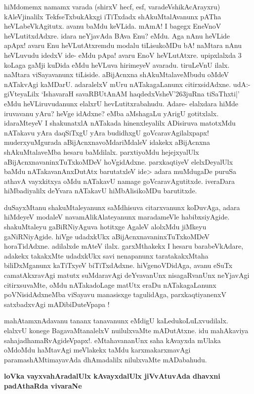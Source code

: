 hiMdomemx namamx varada (shirxV hecf, esf, varadeVshikAcArayxru) kAleVjinalilx TekfseTxbukAkxgi iTiTxdadx shAkuMtalAvanunx pATha heVLabeVkAgitutx. avanu baMdu keVLida. mAmA! I bagegx EneVnoV heVLutitxdAdxre. idara neYjavAda BAva Enu? eMdu. Aga nAnu heVLide apApx! avaru Enu heVLutAtxremdu modalu tiLisukoMDu bA! naMtara nAnu heVLuvudu idedxV ide- eMdu pApa! avaru EnoV heVLutAtxre. upipxlalxda 3 koLaga gaMji kuDida eMdu heVLuva hirimeyeV avaradu. tiruLeVnU ilalx. naMtara viSayavanunx tiLiside. aBijAcnxna shAkuMtalaveMbudu oMdeV nATakvAgi kaMDarU. adaralelxV mUru nATakagaLanunx citirxsidAdxne. udA:- giVteyaLilx `IshavaraH savaRBUtAnAM haqdedxVsheV\char'263juRna tiSaThxti|' eMdu heVLiruvudanunx elalxrU hevLutitxrabahudu. Adare- elalxdara hiMde iruvavanu yAru? heVge idAdxne? eMba aMshagaLu yArigU gotitxlalx. idaraMteyeV I shakunatxlA nATakada hinenxleyalilx ADisiruva matotxMdu nATakavu yAra daqSiTxgU yAra budidhxgU goVcaravAgilalxpapx! muderxyuMgurada aBijAcnxnavoMdariMdaleV idakekx aBijAcnxna shAkuMtalaveMba hesaru baMdilalx. parxtiyoMdu hejejxyalUlx aBijAcnxnavaninxTuTxkoMDeV hoVgidAdxne. parxkaqtiyeV elelxDeyalUlx baMdu nATakavanAnxDutAtx barutatxleV ide> adara muMdugaDe puruSa athavA vayxkitxya oMdu nATakavU namage goVcaravAgutitxde. iveraDara hiMbadiyalilx deYvara nATakavU hiMbAlisikoMDu barutitxde.

duSayxMtanu shakuMtaleyanunx saMdhisuva citarxvanunx koDuvAga, adara hiMdeyeV modaleV navamAlikAlateyanunx maradameVle habibxsiyAgide. shakuMtaleyu gaBiRNiyAguva hotitxge AgaleV alolxMdu jiMkeyu gaNiRNiyAgide. hiVge udadxkUkx aBijAcnxnavaninxTuTxkoMDeV horaTidAdxne. adilalxde mAteV ilalx. garxMthakekx I hesaru barabeVkAdare, adakekx takakxMte udadxkUkx savi nenapanunx taratakakxMtaha biliDxMganunx kaTiTxyeV biTiTxdAdxne. hiVgenoVDidAga, avanu eSuTx camatAkxravAgi matutx suMdaravAgi deYvavanUnx nisagaRvanUnx neYjavAgi citirxsuvaMte, oMdu nATakadoLage matUtx eraDu nATakagaLanunx poVNisidAdxneMba viSayavu manasisxge tagulidAga, parxkaqtiyanenxV satxbadxvAgi mADibiDuteVpapa !

mahAtamxnAdavanu tananx tanavanunx eMdigU kaLedukoLuLxvudilalx. elalxvU konege BagavaMtanalelxV nuilulxvaMte mADutAtxne. idu mahAkaviya sahajadhamaRvAgideVpapx!. eMtahavananUnx saha kAvayxda mUlaka oMdoMdu haMtavAgi meVlakekx taMdu karxmakarxmavAgi paramashAMtimayavAda dhAmadalilx nilulxvaMte mADabahudu.

{\bf loVka vayxvahAradalUlx kAvayxdalUlx jiVvAtuvAda dhavxni padAthaRda vivaraNe}


